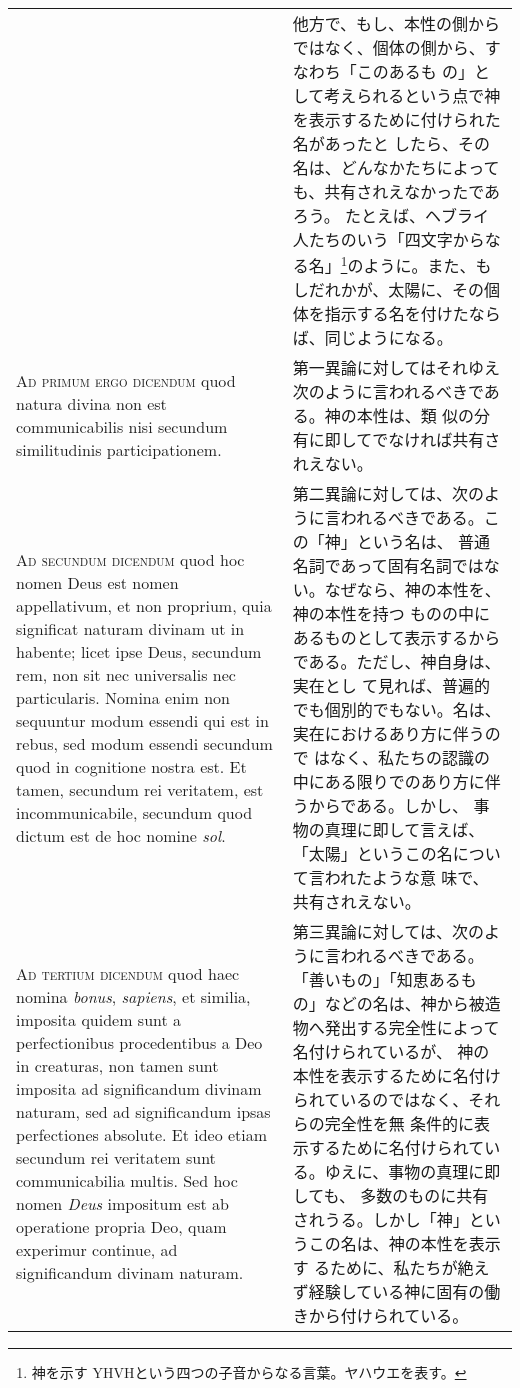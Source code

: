 \documentclass[10pt]{jsarticle} %
\begin{document}
\begin{longtable}{p{21em}p{21em}}
&

他方で、もし、本性の側からではなく、個体の側から、すなわち「このあるも
の」として考えられるという点で神を表示するために付けられた名があったと
したら、その名は、どんなかたちによっても、共有されえなかったであろう。
たとえば、ヘブライ人たちのいう「四文字からなる名」\footnote{神を示す
YHVHという四つの子音からなる言葉。ヤハウエを表す。}のように。また、も
しだれかが、太陽に、その個体を指示する名を付けたならば、同じようになる。


\\

{\scshape Ad primum ergo dicendum} quod natura divina
non est communicabilis nisi secundum similitudinis participationem.

&

第一異論に対してはそれゆえ次のように言われるべきである。神の本性は、類
似の分有に即してでなければ共有されえない。
\\


{\scshape Ad secundum dicendum} quod hoc nomen Deus est
nomen appellativum, et non proprium, quia significat naturam divinam ut
in habente; licet ipse Deus, secundum rem, non sit nec universalis nec
particularis. Nomina enim non sequuntur modum essendi qui est in rebus,
sed modum essendi secundum quod in cognitione nostra est. Et tamen,
secundum rei veritatem, est incommunicabile, secundum quod dictum est de
hoc nomine {\itshape sol}.


&

第二異論に対しては、次のように言われるべきである。この「神」という名は、
普通名詞であって固有名詞ではない。なぜなら、神の本性を、神の本性を持つ
ものの中にあるものとして表示するからである。ただし、神自身は、実在とし
て見れば、普遍的でも個別的でもない。名は、実在におけるあり方に伴うので
はなく、私たちの認識の中にある限りでのあり方に伴うからである。しかし、
事物の真理に即して言えば、「太陽」というこの名について言われたような意
味で、共有されえない。

\\


{\scshape Ad tertium dicendum} quod haec nomina {\itshape bonus},
{\itshape sapiens}, et similia, imposita quidem sunt a perfectionibus
procedentibus a Deo in creaturas, non tamen sunt imposita ad
significandum divinam naturam, sed ad significandum ipsas perfectiones
absolute. Et ideo etiam secundum rei veritatem sunt communicabilia
multis. Sed hoc nomen {\itshape Deus} impositum est ab operatione
propria Deo, quam experimur continue, ad significandum divinam naturam.


&

第三異論に対しては、次のように言われるべきである。「善いもの」「知恵あるも
の」などの名は、神から被造物へ発出する完全性によって名付けられているが、
神の本性を表示するために名付けられているのではなく、それらの完全性を無
条件的に表示するために名付けられている。ゆえに、事物の真理に即しても、
多数のものに共有されうる。しかし「神」というこの名は、神の本性を表示す
るために、私たちが絶えず経験している神に固有の働きから付けられている。


\end{longtable}
\newpage
{}
\end{document}
